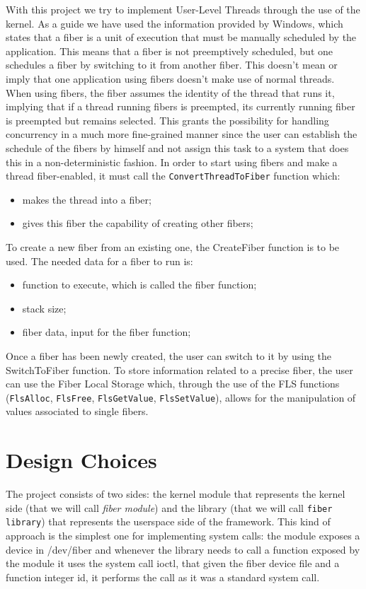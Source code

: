 \documentclass[a4paper,10pt]{article}
\begin{document}
 With this project we try to implement User-Level Threads through the use of the kernel. As a guide we have used the information provided by Windows, which states that a fiber is a unit of execution that must be manually scheduled by the application. This means that a fiber is not preemptively scheduled, but one schedules a fiber by switching to it from another fiber. This doesn’t mean or imply that one application using fibers doesn’t make use of normal threads. When using fibers, the fiber assumes the identity of the thread that runs it, implying that if a thread running fibers is preempted, its currently running fiber is preempted but remains selected. This grants the possibility for handling concurrency in a much more fine-grained manner since the user can establish the schedule of the fibers by himself and not assign this task to a system that does this in a non-deterministic fashion.
 In order to start using fibers and make a thread fiber-enabled, it must call the \lstinline{ConvertThreadToFiber} function which:
 \begin{itemize}
   \item makes the thread into a fiber;
   \item gives this fiber the capability of creating other fibers;
 \end{itemize}
 To create a new fiber from an existing one, the CreateFiber function is to be used. The needed data for a fiber to run is:
 \begin{itemize}
   \item function to execute, which is called the fiber function;
   \item stack size;
   \item fiber data, input for the fiber function;
 \end{itemize}

 Once a fiber has been newly created, the user can switch to it by using the SwitchToFiber function.
 To store information related to a precise fiber, the user can use the Fiber Local Storage which, through the use of the FLS functions (\lstinline{FlsAlloc}, \lstinline{FlsFree}, \lstinline{FlsGetValue}, \lstinline{FlsSetValue}), allows for the manipulation of values associated to single fibers.

\section{Design Choices}
 The project consists of two sides: the kernel module that represents the kernel side (that we will call \textit{fiber module}) and the library (that we will call \texttt{fiber library}) that represents the userspace side of the framework. This kind of approach is the simplest one for implementing system calls: the module exposes a device in /dev/fiber and whenever the library needs to call a function exposed by the module it uses the system call ioctl, that given the fiber device file and a function integer id, it performs the call as it was a standard system call.
\end{document}
